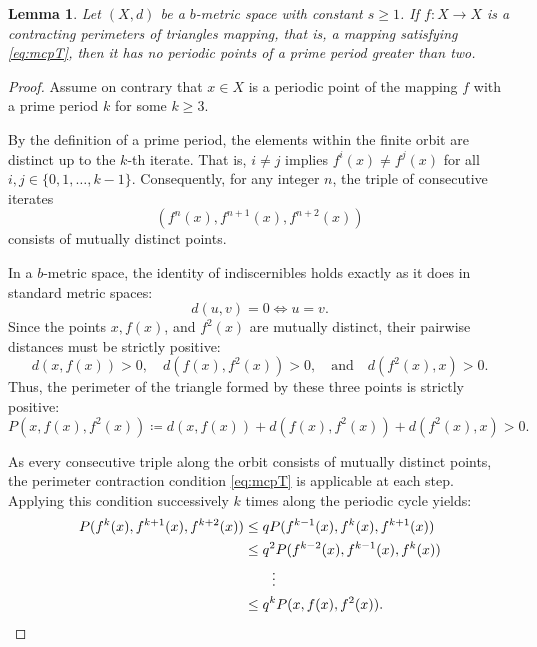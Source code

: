 \documentclass[a4paper,12pt,oneside]{article}
\newtheorem{lemma}[theorem]{Lemma}
\numberwithin{equation}{section}
\begin{document}
\begin{lemma}
\label{lem:no_period_gt2}
Let $(X,d)$ be a $b$-metric space with constant $s\geq 1$. If $f:X\to X$ is a contracting perimeters of triangles mapping, that is, a mapping satisfying \eqref{eq:mcpT}, then it has no periodic points of a prime period greater than two.
\end{lemma}

\begin{proof}
Assume on contrary that $x\in X$ is a periodic point of the mapping $f$ with a prime period $k$ for some $k\geq 3$.

By the definition of a prime period, the elements within the finite orbit are distinct up to the $k$-th iterate. That is, $i\neq j$ implies $f^{i}(x)\neq f^{j}(x)$ for all $i,j\in \{0,1,\ldots,k - 1\}$. Consequently, for any integer $n$, the triple of consecutive iterates
\[
(f^{n}(x),f^{n + 1}(x),f^{n + 2}(x))
\]
consists of mutually distinct points.

In a $b$-metric space, the identity of indiscernibles holds exactly as it does in standard metric spaces:
\[
d(u,v) = 0\iff u = v.
\]
Since the points $x,f(x)$, and $f^{2}(x)$ are mutually distinct, their pairwise distances must be strictly positive:
\begin{equation}
d(x,f(x)) > 0,\quad d(f(x),f^{2}(x)) > 0,\quad \text{and}\quad d(f^{2}(x),x) > 0.
\label{eq:dist_pos}
\end{equation}
Thus, the perimeter of the triangle formed by these three points is strictly positive:
\begin{equation}
P(x,f(x),f^{2}(x))\coloneqq d(x,f(x)) + d(f(x),f^{2}(x)) + d(f^{2}(x),x) > 0.
\label{eq:perim_pos}
\end{equation}

As every consecutive triple along the orbit consists of mutually distinct points, the perimeter contraction condition \eqref{eq:mcpT} is applicable  at each step. Applying this condition successively $k$ times along the periodic cycle yields:
\begin{align}
P(f^{k}(x),f^{k + 1}(x),f^{k + 2}(x)) &\leq q P(f^{k - 1}(x),f^{k}(x),f^{k + 1}(x)) \notag\\
&\leq q^{2}P(f^{k - 2}(x),f^{k - 1}(x),f^{k}(x)) \notag\\
&\qquad \vdots \notag\\
&\leq q^{k}P(x,f(x),f^{2}(x)).
\label{eq:period_chain}
\end{align}


\end{proof}
\end{document}
